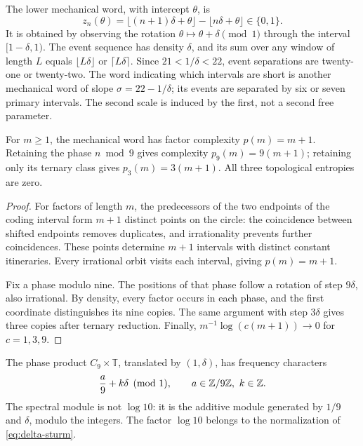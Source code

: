 The lower mechanical word, with intercept \(\theta\), is
\[
 z_n(\theta)=\lfloor(n+1)\delta+\theta\rfloor-\lfloor n\delta+\theta\rfloor\in\{0,1\}.
\]
It is obtained by observing the rotation \(\theta\mapsto\theta+\delta\pmod1\) through the interval \([1-\delta,1)\). The event sequence has density \(\delta\), and its sum over any window of length \(L\) equals \(\lfloor L\delta\rfloor\) or \(\lceil L\delta\rceil\). Since \(21<1/\delta<22\), event separations are twenty-one or twenty-two. The word indicating which intervals are short is another mechanical word of slope \(\sigma=22-1/\delta\); its events are separated by six or seven primary intervals. The second scale is induced by the first, not a second free parameter.



\begin{theorem}
For \(m\ge1\), the mechanical word has factor complexity \(p(m)=m+1\). Retaining the phase \(n\bmod9\) gives complexity \(p_9(m)=9(m+1)\); retaining only its ternary class gives \(p_3(m)=3(m+1)\). All three topological entropies are zero.
\end{theorem}
\begin{proof}
For factors of length \(m\), the predecessors of the two endpoints of the coding interval form \(m+1\) distinct points on the circle: the coincidence between shifted endpoints removes duplicates, and irrationality prevents further coincidences. These points determine \(m+1\) intervals with distinct constant itineraries. Every irrational orbit visits each interval, giving \(p(m)=m+1\).

Fix a phase modulo nine. The positions of that phase follow a rotation of step \(9\delta\), also irrational. By density, every factor occurs in each phase, and the first coordinate distinguishes its nine copies. The same argument with step \(3\delta\) gives three copies after ternary reduction. Finally, \(m^{-1}\log(c(m+1))\to0\) for \(c=1,3,9\).
\end{proof}

The phase product \(C_9\times\mathbb T\), translated by \((1,\delta)\), has frequency characters
\[
 \frac a9+k\delta\pmod1,\qquad a\in\mathbb Z/9\mathbb Z,\ k\in\mathbb Z.
\]
The spectral module is not \(\log10\): it is the additive module generated by \(1/9\) and \(\delta\), modulo the integers. The factor \(\log10\) belongs to the normalization of \eqref{eq:delta-sturm}.

